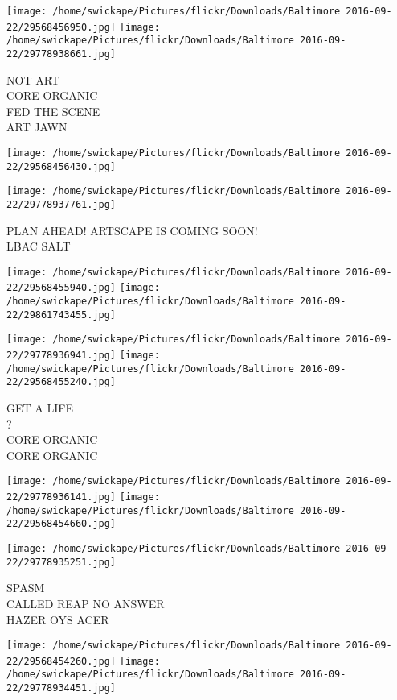 \documentclass[10pt,letterpaper]{article}
\begin{document}
\texttt{[image: /home/swickape/Pictures/flickr/Downloads/Baltimore 2016-09-22/29568456950.jpg]}
\texttt{[image: /home/swickape/Pictures/flickr/Downloads/Baltimore 2016-09-22/29778938661.jpg]}

NOT ART\\
CORE ORGANIC\\
FED THE SCENE\\
ART JAWN
\pagebreak

\texttt{[image: /home/swickape/Pictures/flickr/Downloads/Baltimore 2016-09-22/29568456430.jpg]}

\vspace{0.25in}
\texttt{[image: /home/swickape/Pictures/flickr/Downloads/Baltimore 2016-09-22/29778937761.jpg]}

PLAN AHEAD!  ARTSCAPE IS COMING SOON!\\
LBAC SALT
\pagebreak

\texttt{[image: /home/swickape/Pictures/flickr/Downloads/Baltimore 2016-09-22/29568455940.jpg]}
\texttt{[image: /home/swickape/Pictures/flickr/Downloads/Baltimore 2016-09-22/29861743455.jpg]}

\texttt{[image: /home/swickape/Pictures/flickr/Downloads/Baltimore 2016-09-22/29778936941.jpg]}
\texttt{[image: /home/swickape/Pictures/flickr/Downloads/Baltimore 2016-09-22/29568455240.jpg]}

GET A LIFE\\
?\\
CORE ORGANIC\\
CORE ORGANIC
\pagebreak

\texttt{[image: /home/swickape/Pictures/flickr/Downloads/Baltimore 2016-09-22/29778936141.jpg]}
\texttt{[image: /home/swickape/Pictures/flickr/Downloads/Baltimore 2016-09-22/29568454660.jpg]}

\vspace{0.25in}
\texttt{[image: /home/swickape/Pictures/flickr/Downloads/Baltimore 2016-09-22/29778935251.jpg]}

SPASM\\
CALLED REAP NO ANSWER\\
HAZER OYS ACER
\pagebreak

\texttt{[image: /home/swickape/Pictures/flickr/Downloads/Baltimore 2016-09-22/29568454260.jpg]}
\texttt{[image: /home/swickape/Pictures/flickr/Downloads/Baltimore 2016-09-22/29778934451.jpg]}
\end{document}
